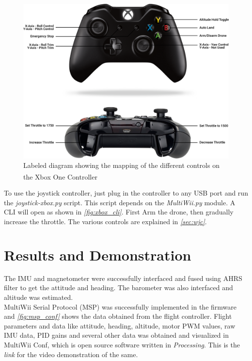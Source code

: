 \documentclass[a4paper,12pt,oneside]{book}
\begin{document}
\begin{figure}[!htb]
\centering
\includegraphics[width=\textwidth]{images/joystick_controls}
\caption{Labeled diagram showing the mapping of the different controls on the Xbox\textsuperscript{\textregistered} One Controller\cite{xbox}}
\label{fig:joycon}
\end{figure}

To use the joystick controller, just plug in the controller to any USB port and run the \textit{joystick-xbox.py} script. This script depends on the \textit{MultiWii.py} module. A CLI will open as shown in \textit{\autoref{fig:xbox_cli}}. First Arm the drone, then gradually increase the throttle. The various controls are explained in \textit{\autoref{sec:wjc}}.

\section{Results and Demonstration}
The IMU and magnetometer were successfully interfaced and fused using AHRS filter to get the attitude and heading. The barometer was also interfaced and altitude was estimated.\\

MultiWii Serial Protocol (MSP) was successfully implemented in the firmware and \textit{\autoref{fig:msp_conf}} shows the data obtained from the flight controller. Flight parameters and data like attitude, heading, altitude, motor PWM values, raw IMU data, PID gains and several other data was obtained and visualized in MultiWii Conf, which is open source software written in \textit{Processing}. This is the \textit{link} for the video demonstration of the same.\\
\end{document}
